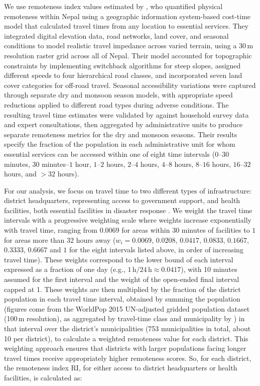 \documentclass[nhess, manuscript]{copernicus}
\begin{document}
We use remoteness index values estimated by \citet{banick2019}, who quantified physical remoteness within Nepal using a geographic information system-based cost-time model that calculated travel times from any location to essential services. They integrated digital elevation data, road networks, land cover, and seasonal conditions to model realistic travel impedance across varied terrain, using a 30\,\unit{m} resolution raster grid across all of Nepal. Their model accounted for topographic constraints by implementing switchback algorithms for steep slopes, assigned different speeds to four hierarchical road classes, and incorporated seven land cover categories for off-road travel. Seasonal accessibility variations were captured through separate dry and monsoon season models, with appropriate speed reductions applied to different road types during adverse conditions. The resulting travel time estimates were validated by \citet{banick2019} against household survey data and expert consultations, then aggregated by administrative units to produce separate remoteness metrics for the dry and monsoon seasons. Their results specify the fraction of the population in each administrative unit for whom essential services can be accessed within one of eight time intervals ($0$--$30$ minutes, $30$ minutes--$1$ hour, $1$--$2$ hours, $2$--$4$ hours, $4$--$8$ hours, $8$--$16$ hours, $16$--$32$ hours, and $>32$ hours).

For our analysis, we focus on travel time to two different types of infrastructure: district headquarters, representing access to government support, and health facilities, both essential facilities in disaster response \citep{NationalPlanningCommission2015}. We weight the travel time intervals with a progressive weighting scale where weights increase exponentially with travel time, ranging from $0.0069$ for areas within 30 minutes of facilities to $1$ for areas more than 32 hours away ($w_i = 0.0069$, $0.0208$, $0.0417$, $0.0833$, $0.1667$, $0.3333$, $0.6667$ and $1$ for the eight intervals listed above, in order of increasing travel time). These weights correspond to the lower bound of each interval expressed as a fraction of one day (e.g., $1\,\mathrm{h}/24\,\mathrm{h} \approx 0.0417$), with 10 minutes assumed for the first interval and the weight of the open-ended final interval capped at 1. These weights are then multiplied by the fraction of the district population in each travel time interval, obtained by summing the population (figures come from the WorldPop 2015 UN-adjusted gridded population dataset (100\,\unit{m} resolution), as aggregated by travel-time class and municipality by \citet{banick2019}) in that interval over the district's municipalities (753 municipalities in total, about 10 per district), to calculate a weighted remoteness value for each district. This weighting approach ensures that districts with larger populations facing longer travel times receive appropriately higher remoteness scores. So, for each district, the remoteness index $\text{RI}$, for either access to district headquarters or health facilities, is calculated as:
\end{document}
